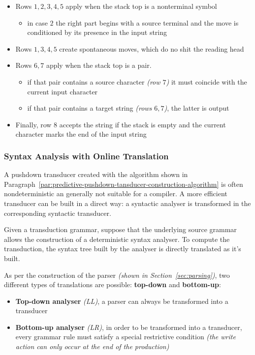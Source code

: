 \documentclass[english]{article}
\begin{document}
\begin{itemize}
  \item Rows \(1, 2, 3, 4, 5\) apply when the stack top is a nonterminal symbol
        \begin{itemize}[label=\(\rightarrow\)]
          \item in case \(2\) the right part begins with a source terminal and the move is conditioned by its presence in the input string
        \end{itemize}
  \item Rows \(1, 3, 4, 5\) create spontaneous moves, which do no shit the reading head
  \item Rows \(6, 7\) apply when the stack top is a pair.
        \begin{itemize}[label=\(\rightarrow\)]
          \item if that pair contains a source character \textit{(row \(7\))} it must coincide with the current input character
          \item if that pair contains a target string \textit{(rows \(6, 7\))}, the latter is output
        \end{itemize}
  \item Finally, row \(8\) accepts the string if the stack is empty and the current character marks the end of the input string
\end{itemize}

\subsubsection{Syntax Analysis with Online Translation}

A pushdown transducer created with the algorithm shown in Paragraph~\ref{par:predictive-pushdown-tansducer-construction-algorithm} is often nondeterministic an generally not suitable for a compiler.
A more efficient transducer can be built in a direct way:
a syntactic analyser is transformed in the corresponding syntactic transducer.

Given a transduction grammar, suppose that the underlying source grammar allows the construction of a deterministic syntax analyser.
To compute the transduction, the syntax tree built by the analyser is directly translated as it's built.

As per the construction of the parser \textit{(shown in Section~\ref{sec:parsing})}, two different types of translations are possible:
\textbf{top-down} and \textbf{bottom-up}:

\begin{itemize}
  \item \textbf{Top-down analyser} \textit{(LL)}, a parser can always be transformed into a transducer
  \item \textbf{Bottom-up analyser} \textit{(LR)}, in order to be transformed into a transducer, every grammar rule must satisfy a special restrictive condition \textit{(the write action can only occur at the end of the production)}
\end{itemize}
\end{document}
